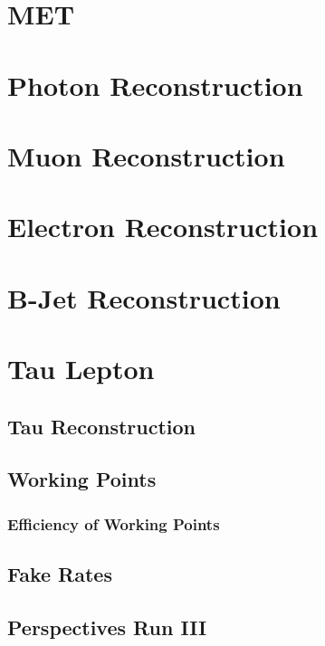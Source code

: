 
\section{MET}
\label{sec:MET}

\section{Photon Reconstruction}
\label{sec:Photon}


\section{Muon Reconstruction}
\label{sec:Muon}

\section{Electron Reconstruction}
\label{sec:Electron}

\section{B-Jet Reconstruction}
\label{sec:BJet}



\section{Tau Lepton}
\label{sec:Tau}


\subsection{Tau Reconstruction}
\label{subsec:TauReconstruction}

\subsection{Working Points}
\label{subsec:wp}

\subsubsection{Efficiency of Working Points}
\label{subsubsec:Eff_WP}

\subsection{Fake Rates}
\label{subsec:FakeRates}

\subsection{Perspectives Run III}
\label{subsec:Perspectives} 